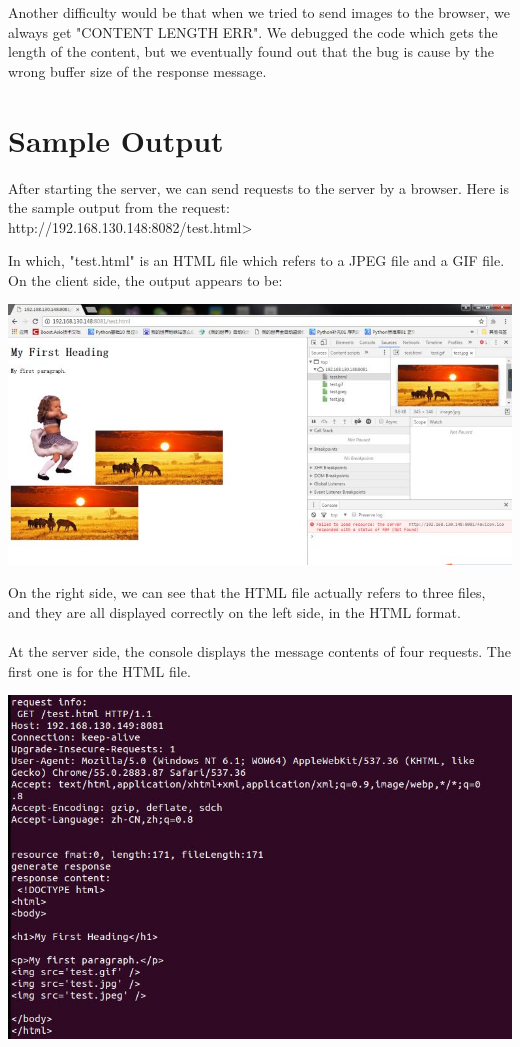\documentclass[a4paper, 11pt]{report}
\begin{document}
\noindent Another difficulty would be that when we tried to send images to the browser, we always get "CONTENT LENGTH ERR". We debugged the code which gets the length of the content, but we eventually found out that the bug is cause by the wrong buffer size of the response message.


\section*{Sample Output}

After starting the server, we can send requests to the server by a browser. Here is the sample output from the request:
\scriptsize
{\selectfont
\mbox{}\\
\indent http://192.168.130.148:8082/test.html>
}
\normalsize

\noindent In which, "test.html" is an HTML file which refers to a JPEG file and a GIF file. On the client side, the output appears to be:

\includegraphics[scale=0.54]{client_output.jpg}

\noindent On the right side, we can see that the HTML file actually refers to three files, and they are all displayed correctly on the left side, in the HTML format.\\\\

\noindent At the server side, the console displays the message contents of four requests. The first one is for the HTML file.

\includegraphics[scale=0.54]{HTML_test.jpg}
\end{document}
